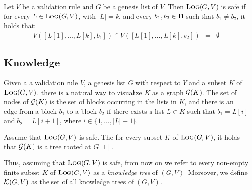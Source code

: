 %
%

\begin{mydef}
Let $V$ be a validation rule and $G$ be a genesis list of $V$. Then $\text{\sc Log}(G,V)$ is safe if for every $L \in \text{\sc Log}(G,V)$, with $|L| = k$, and every $b_1, b_2 \in \text{\bf B}$ such that $b_1 \neq b_2$, it holds that$:$
\begin{eqnarray*}
V([L[1], \ldots, L[k], b_1]) \cap V([L[1], \ldots, L[k], b_2]) & = & \emptyset
\end{eqnarray*}
\end{mydef}

\subsection{Knowledge}

Given a  a validation rule $V$, a genesis list $G$ with respect to $V$ and a subset $K$ of $\text{\sc Log}(G,V)$, there is a natural way to  visualize  $K$ as a graph $\mathcal{G}(K)$. The set of nodes of $\mathcal{G}(K)$ is the set of blocks occurring in the lists in $K$, and there is an edge from a block $b_1$ to a block $b_2$ if there exists a list $L \in K$ such that $b_1 = L[i]$ and $b_2 = L[i+1]$, where $i \in \{1, \ldots, |L| -1\}$.
\begin{mylem}
Assume that $\text{\sc Log}(G,V)$ is safe. The for every subset $K$ of $\text{\sc Log}(G,V)$, it holds that $\mathcal{G}(K)$ is a tree rooted at $G[1]$.
\end{mylem}
Thus, assuming that $\text{\sc Log}(G,V)$ is safe, from now on we refer to every non-empty finite subset $K$ of $\text{\sc Log}(G,V)$ as a {\em knowledge tree} of $(G,V)$. Moreover, we define $\mathcal{K}(G,V)$ as the set of all knowledge trees of $(G,V)$.


